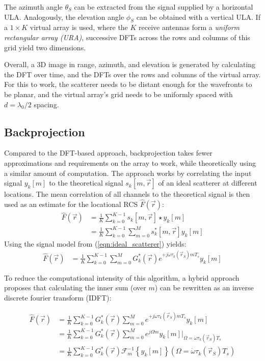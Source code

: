 The azimuth angle $\theta_S$ can be extracted from the signal supplied by a horizontal ULA.
Analogously, the elevation angle $\phi_S$ can be obtained with a vertical ULA.
If a $1\times K$ virtual array is used, where the $K$ receive antennas form a \emph{uniform rectangular array (URA)},
successive DFTs across the rows and columns of this grid yield two dimensions.

Overall, a 3D image in range, azimuth, and elevation is generated
by calculating the DFT over time, and the DFTs over the rows and columns of the virtual array.
For this to work, the scatterer needs to be distant enough for the wavefronts to be planar,
and the virtual array's grid needs to be uniformly spaced with $d=\lambda_0/2$ spacing.

\subsection{Backprojection}
\label{ssec:bp_imaging_theory}
Compared to the DFT-based approach, backprojection takes fewer approximations and requirements on the array to work,
while theoretically using a similar amount of computation.
The approach works by correlating the input signal $y_k[m]$
to the theoretical signal $s_k[m, \vec r]$ of an ideal scatterer at different locations.
The mean correlation of all channels to the theoretical signal is then used as an estimate for the locational RCS $\hat F(\vec r)$:
\begin{align}
    \hat F(\vec r) & = \frac{1}{K} \sum_{k=0}^{K-1} s_k[m, \vec r] \star y_k[m]             \\
                   & = \frac{1}{K}\sum_{k=0}^{K-1}\sum_{m=0}^{M} s_k^\ast[m, \vec r] y_k[m]
\end{align}
Using the signal model from (\ref*{eqn:ideal_scatterer}) yields:
\begin{align}
    \hat F(\vec r) & = \frac{1}{K}\sum_{k=0}^{K-1}\sum_{m=0}^{M}
    G_k^\ast(\vec r)e^{+j\dot\omega\tau_k(\vec r_S)mT_s} y_k[m]
\end{align}

To reduce the computational intensity of this algorithm,
a hybrid approach\cite{realtime_bp} proposes that
calculating the inner sum (over $m$) can be rewritten as an inverse discrete fourier transform (IDFT):

\begin{align}
    \hat F(\vec r) & = \frac{1}{K}\sum_{k=0}^{K-1}G_k^\ast(\vec r)
    \sum_{m=0}^{M} e^{+j\dot\omega\tau_k(\vec r_S)mT_s} y_k[m]     \\
                   & = \frac{1}{K}\sum_{k=0}^{K-1}G_k^\ast(\vec r)
    \sum_{m=0}^{M} e^{j\Omega m} y_k[m]
    \Big|_{\Omega=\dot\omega\tau_k(\vec r_S)T_s}                   \\
                   & = \frac{1}{K}\sum_{k=0}^{K-1}G_k^\ast(\vec r)
    \mathcal{F}_m^{-1} \left\{ y_k[m]\right\}(\Omega=\dot\omega\tau_k(\vec r_S)T_s)
\end{align}


